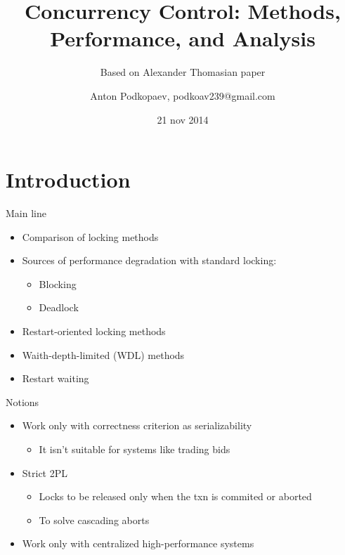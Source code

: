 \documentclass[sans]{beamer}
\begin{document}
\title
[Concurrency Control]
{Concurrency Control: Methods, Performance, and Analysis}

\subtitle{Based on Alexander Thomasian paper}

\author
[Podkopaev]{Anton Podkopaev, podkoav239@gmail.com}
\date [21-11-14]{21 nov 2014}

\begin{frame}[plain]
	\titlepage
\end{frame}

\section{Introduction}

\begin{frame}{Main line}
  \begin{itemize}
    \item Comparison of locking methods

    \item Sources of performance degradation with standard locking:
      \begin{itemize}
        \item Blocking
        \item Deadlock
      \end{itemize}

    \item Restart-oriented locking methods
    \item Waith-depth-limited (WDL) methods

    \item Restart waiting
  \end{itemize}
\end{frame}

\begin{frame}{Notions}
  \begin{itemize}
    \item Work only with correctness criterion as serializability
    \begin{itemize}
      \item It isn't suitable for systems like trading bids
    \end{itemize}
    
    \item Strict 2PL
    \begin{itemize}
      \item Locks to be released only when the txn is
            commited or aborted
      \item To solve cascading aborts
    \end{itemize}

    \item Work only with centralized high-performance systems
  \end{itemize}
\end{frame}
\end{document}
